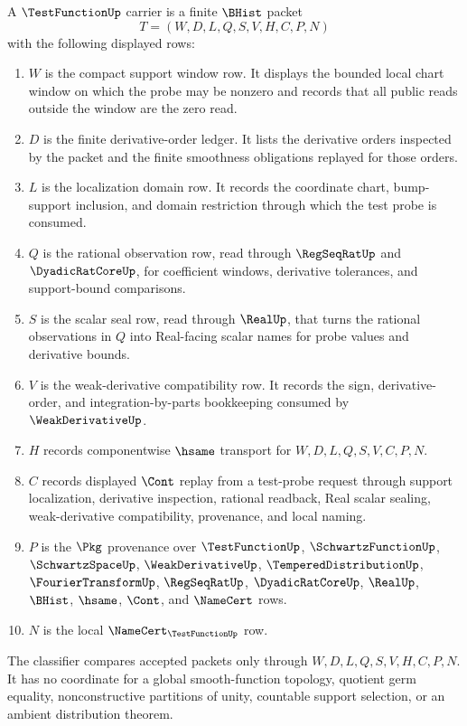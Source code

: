 \begin{definition}
\label{def:test-function-carrier}
A $\TestFunctionUp$ carrier is a finite $\BHist$ packet
$$
T=(W,D,L,Q,S,V,H,C,P,N)
$$
with the following displayed rows:
\begin{enumerate}
\item $W$ is the compact support window row. It displays the bounded local chart window on which the probe may be nonzero and records that all public reads outside the window are the zero read.
\item $D$ is the finite derivative-order ledger. It lists the derivative orders inspected by the packet and the finite smoothness obligations replayed for those orders.
\item $L$ is the localization domain row. It records the coordinate chart, bump-support inclusion, and domain restriction through which the test probe is consumed.
\item $Q$ is the rational observation row, read through $\RegSeqRatUp$ and $\DyadicRatCoreUp$, for coefficient windows, derivative tolerances, and support-bound comparisons.
\item $S$ is the scalar seal row, read through $\RealUp$, that turns the rational observations in $Q$ into Real-facing scalar names for probe values and derivative bounds.
\item $V$ is the weak-derivative compatibility row. It records the sign, derivative-order, and integration-by-parts bookkeeping consumed by $\WeakDerivativeUp$.
\item $H$ records componentwise $\hsame$ transport for $W,D,L,Q,S,V,C,P,N$.
\item $C$ records displayed $\Cont$ replay from a test-probe request through support localization, derivative inspection, rational readback, Real scalar sealing, weak-derivative compatibility, provenance, and local naming.
\item $P$ is the $\Pkg$ provenance over $\TestFunctionUp$, $\SchwartzFunctionUp$, $\SchwartzSpaceUp$, $\WeakDerivativeUp$, $\TemperedDistributionUp$, $\FourierTransformUp$, $\RegSeqRatUp$, $\DyadicRatCoreUp$, $\RealUp$, $\BHist$, $\hsame$, $\Cont$, and $\NameCert$ rows.
\item $N$ is the local $\NameCert_{\TestFunctionUp}$ row.
\end{enumerate}
The classifier compares accepted packets only through $W,D,L,Q,S,V,H,C,P,N$. It has no coordinate for a global smooth-function topology, quotient germ equality, nonconstructive partitions of unity, countable support selection, or an ambient distribution theorem.
\end{definition}

